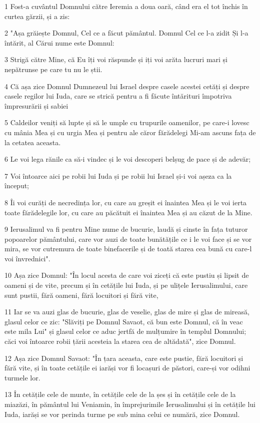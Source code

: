 \par 1 Fost-a cuvântul Domnului către Ieremia a doua oară, când era el tot închis în curtea gărzii, și a zis:
\par 2 "Așa grăiește Domnul, Cel ce a făcut pământul. Domnul Cel ce l-a zidit Și l-a întărit, al Cărui nume este Domnul:
\par 3 Strigă către Mine, că Eu îți voi răspunde și iți voi arăta lucruri mari și nepătrunse pe care tu nu le știi.
\par 4 Că așa zice Domnul Dumnezeul lui Israel despre casele acestei cetăți și despre casele regilor lui Iuda, care se strică pentru a fi făcute întărituri împotriva împresurării și sabiei
\par 5 Caldeilor veniți să lupte și să le umple cu trupurile oamenilor, pe care-i lovesc cu mânia Mea și cu urgia Mea și pentru ale căror fărădelegi Mi-am ascuns fața de la cetatea aceasta.
\par 6 Le voi lega rănile ca să-i vindec și le voi descoperi belșug de pace și de adevăr;
\par 7 Voi întoarce aici pe robii lui Iuda și pe robii lui Israel și-i voi așeza ca la început;
\par 8 Îi voi curăți de necredința lor, cu care au greșit ei înaintea Mea și le voi ierta toate fărădelegile lor, cu care au păcătuit ei înaintea Mea și au căzut de la Mine.
\par 9 Ierusalimul va fi pentru Mine nume de bucurie, laudă și cinste în fața tuturor popoarelor pământului, care vor auzi de toate bunătățile ce i le voi face și se vor mira, se vor cutremura de toate binefacerile și de toată starea cea bună cu care-l voi învrednici".
\par 10 Așa zice Domnul: "În locul acesta de care voi ziceți că este pustiu și lipsit de oameni și de vite, precum și în cetățile lui Iuda, și pe ulițele Ierusalimului, care sunt pustii, fără oameni, fără locuitori și fără vite,
\par 11 Iar se va auzi glas de bucurie, glas de veselie, glas de mire și glas de mireasă, glasul celor ce zic: "Slăviți pe Domnul Savaot, că bun este Domnul, că în veac este mila Lui" și glasul celor ce aduc jertfă de mulțumire în templul Domnului; căci voi întoarce robii țării acesteia la starea cea de altădată", zice Domnul.
\par 12 Așa zice Domnul Savaot: "În țara aceasta, care este pustie, fără locuitori și fără vite, și în toate cetățile ei iarăși vor fi locașuri de păstori, care-și vor odihni turmele lor.
\par 13 În cetățile cele de munte, în cetățile cele de la șes și în cetățile cele de la miazăzi, în pământul lui Veniamin, în împrejurimile Ierusalimului și în cetățile lui Iuda, iarăși se vor perinda turme pe sub mina celui ce numără, zice Domnul.
